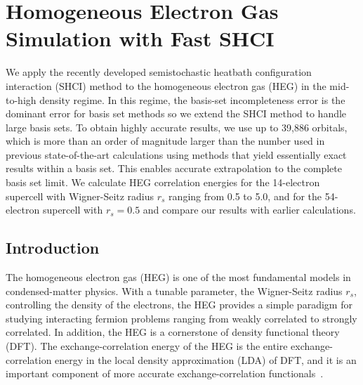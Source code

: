 \chapter{Homogeneous Electron Gas Simulation with Fast SHCI}
We apply the recently developed semistochastic heatbath configuration interaction (SHCI) method to the homogeneous electron gas (HEG) in the mid-to-high density regime.
In this regime, the basis-set incompleteness error is the dominant error for
basis set
methods
so we extend the SHCI method to handle large basis sets.
To obtain highly accurate results, we use up to 39,886 orbitals, which is more than an order of magnitude larger than
the number used in previous state-of-the-art calculations using methods that yield essentially exact results
within a basis set.
This enables accurate extrapolation to the complete basis set limit.
We calculate HEG correlation energies for the 14-electron supercell with Wigner-Seitz radius $r_s$ ranging from 0.5 to 5.0,
and for the 54-electron supercell with $r_s=0.5$ and compare our results with earlier calculations.

\section{Introduction}
The homogeneous electron gas (HEG) is one of the most fundamental models in condensed-matter physics.
With a tunable parameter, the Wigner-Seitz radius $r_s$, controlling the density of the electrons,
the HEG provides a simple paradigm for studying interacting fermion problems
ranging from weakly correlated to strongly correlated.
In addition, the HEG is a cornerstone of density functional theory (DFT).
The exchange-correlation energy of the HEG is the entire exchange-correlation energy in the
local density approximation (LDA) of DFT, and it is an important component of more accurate exchange-correlation functionals~\cite{ParYan-BOOK-89,DreGro-BOOK-90}.

